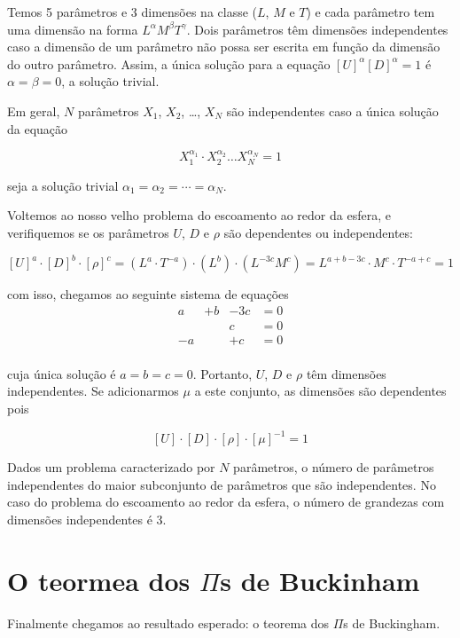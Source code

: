 Temos 5 parâmetros e 3 dimensões na classe ($L$, $M$ e $T$) e cada parâmetro tem uma dimensão na forma $L^\alpha M^\beta T^\gamma$. Dois parâmetros têm dimensões independentes caso a dimensão de um parâmetro não possa ser escrita em função da dimensão do outro parâmetro. Assim, a única solução para a equação $[U]^\alpha [D]^\alpha = 1$ é $\alpha = \beta = 0$, a solução trivial.

Em geral, $N$ parâmetros $X_1$, $X_2$, \ldots, $X_N$ são independentes caso a única solução da equação

\[
X_1^{\alpha_1} \cdot X_2^{\alpha_2} \ldots X_N^{\alpha_N} = 1
\]

seja a solução trivial $\alpha_1 = \alpha_2 = \cdots = \alpha_N$.

Voltemos ao nosso velho problema do escoamento ao redor da esfera, e verifiquemos se os parâmetros $U$, $D$ e $\rho$ são dependentes ou independentes:

\[
  [U]^a \cdot [D]^b \cdot [\rho]^c = (L^a \cdot T^{-a}) \cdot (L^b) \cdot (L^{-3c}M^c) =
  L^{a+b-3c}\cdot M^c \cdot T^{-a + c} = 1
\]

com isso, chegamos ao seguinte sistema de equações
\[
\begin{aligned}
  a &+ b &- 3c &= 0 \\
  & & c & = 0 \\
  -a & &+c & = 0\\
\end{aligned}
\]

cuja única solução é $a=b=c=0$. Portanto, $U$, $D$ e $\rho$ têm dimensões independentes. Se adicionarmos $\mu$ a este conjunto, as dimensões são dependentes pois

\[
  [U] \cdot [D] \cdot [\rho] \cdot [\mu]^{-1} = 1
\]

Dados um problema caracterizado por $N$ parâmetros, o número de parâmetros independentes do maior subconjunto de parâmetros que são independentes. No caso do problema do escoamento ao redor da esfera, o número de grandezas com dimensões independentes é 3.




  
  
\section{O teormea dos $\Pi$s de Buckinham}

Finalmente chegamos ao resultado esperado: o teorema dos $\Pi$s de Buckingham.


